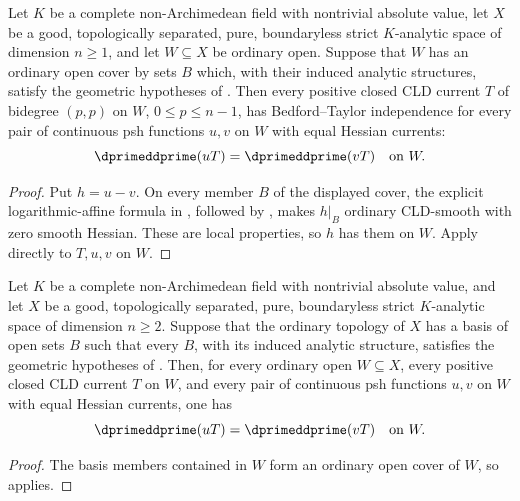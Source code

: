 \begin{corollary}
\label{cor:p213-endpoint-tower-cover-bt}
Let \(K\) be a complete non-Archimedean field with nontrivial absolute
value, let \(X\) be a good, topologically separated, pure,
boundaryless strict \(K\)-analytic space of dimension \(n\geq1\), and let
\(W\subseteq X\) be ordinary open.  Suppose that \(W\) has an ordinary
open cover by sets \(B\) which, with their induced analytic structures,
satisfy the geometric hypotheses of
.  Then every
positive closed CLD current \(T\) of bidegree \((p,p)\) on \(W\),
\(0\leq p\leq n-1\), has Bedford--Taylor independence for every pair of
continuous psh functions \(u,v\) on \(W\) with equal Hessian currents:
\[
                 \dprimeddprime(uT)=\dprimeddprime(vT)
                 \quad\text{on }W.
\]
\end{corollary}

\begin{proof}
Put \(h=u-v\).  On every member \(B\) of the displayed cover,
the explicit logarithmic-affine formula in
, followed by
, makes \(h|_B\) ordinary CLD-smooth with zero
smooth Hessian.  These are local properties, so \(h\) has them on \(W\).
Apply  directly to \(T,u,v\) on \(W\).
\end{proof}

\begin{corollary}
\label{cor:p213-endpoint-tower-basis-bt}
Let \(K\) be a complete non-Archimedean field with nontrivial absolute
value, and let \(X\) be a good, topologically separated, pure,
boundaryless strict \(K\)-analytic space of dimension \(n\geq2\).  Suppose
that the ordinary topology of \(X\) has a basis of open sets \(B\) such
that every \(B\), with its induced analytic structure, satisfies the
geometric hypotheses of .  Then, for every ordinary
open \(W\subseteq X\), every positive closed CLD current \(T\) on \(W\),
and every pair of continuous psh functions \(u,v\) on \(W\) with equal
Hessian currents, one has
\[
                 \dprimeddprime(uT)=\dprimeddprime(vT)
                 \quad\text{on }W.
\]
\end{corollary}

\begin{proof}
The basis members contained in \(W\) form an ordinary open cover of \(W\),
so  applies.
\end{proof}

